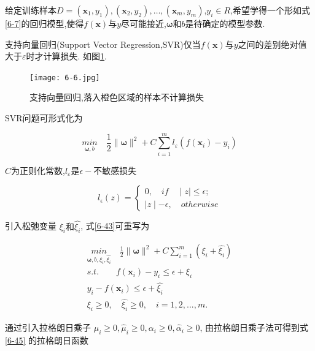 \documentclass[12pt]{article}
\numberwithin{equation}{section}%
\begin{document}
给定训练样本$D={(\boldsymbol{x}_{1},y_{1}),(\boldsymbol{x}_{2},y_{2}),\ldots,(\boldsymbol{x}_{m},y_{m})}$,$y_{i} \in R$,希望学得一个形如式\ref{6-7}的回归模型,使得$f(\boldsymbol{x})$与$y$尽可能接近,$\boldsymbol{\omega}$和$b$是待确定的模型参数.

支持向量回归(Support Vector Regression,SVR)仅当$f(\boldsymbol{x})$与$y$之间的差别绝对值大于$\varepsilon$时才计算损失. 如图\ref{6.6}.

\begin{figure}
\centering\texttt{[image: 6-6.jpg]}
\caption{支持向量回归,落入橙色区域的样本不计算损失}
\label{6.6}
\end{figure}

SVR问题可形式化为

\begin{equation}
{\underset{\boldsymbol{\omega},b}{min}} \quad \frac{1}{2}\parallel\boldsymbol{\omega}\parallel^{2}+C\sum_{i=1}^{m}l_{\varepsilon}(f(\boldsymbol{x}_{i})-y_{i})
\label{6-43}
\end{equation}

$C$为正则化常数,$l_{\varepsilon}$是$\epsilon-$不敏感损失

\begin{equation}
l_{\epsilon}(z)=
 \left\{ \begin{array}{ll}
0, \quad if  \quad \mid z\mid \leqslant \epsilon;\\
\mid z\mid - \epsilon,  \quad otherwise
\end{array} \right.
\end{equation}

引入松弛变量 $\xi_{i}和\hat{\xi_{i}}$, 式\ref{6-43}可重写为

\begin{equation}
\begin{split}
{\underset{\boldsymbol{\omega},b,\xi_{i},\hat{\xi_{i}}}{min}} \quad \frac{1}{2}\parallel\boldsymbol{\omega}\parallel^{2}+C\sum_{i=1}^{m}(\xi_{i}+\hat{\xi_{i}}) \\
s.t. \qquad f(\boldsymbol{x}_{i})-y_{i} \leq \epsilon + \xi_{i} \\
      y_{i}-f(\boldsymbol{x}_{i}) \leq \epsilon + \hat{\xi_{i}} \\
      \xi_{i} \geq 0, \quad \hat{\xi_{i}} \geq 0, \quad i=1,2,...,m.
\end{split}
\label{6-45}
\end{equation}

通过引入拉格朗日乘子 $\mu_{i} \geq 0, \hat{\mu}_{i} \geq 0, \alpha_{i} \geq 0, \hat{\alpha}_{i} \geq 0$, 由拉格朗日乘子法可得到式 \ref{6-45} 的拉格朗日函数
\end{document}
